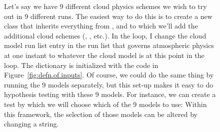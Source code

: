 \begin{latexonly}
\begin{figure}[p]
\caption{Let's say we have 9 different cloud physics schemes we wish
	to try out in 9 different runs.  The easiest way to do this
	is to create a new class  that
	inherits everything from , and to which we'll
	add the additional cloud schemes (, ,
	etc.).
	In the  loop, I change the cloud model
	run list entry in the run list that governs
	atmospheric physics at one instant to whatever the cloud
	model is at this point in the loop.
	The  dictionary is initialized with the code in
	Figure~\ref{fig:defn.of.inputs}.
	Of course, we could do the same thing by running the 9
	models separately, but this set-up makes it easy to do
	hypothesis testing with these 9 models.  For instance, we
	can create a test by which we will choose which of the 9
	models to use:  Within this framework, the selection of
	those models can be altered by changing a string.}
\label{fig:alt.param.inherit.eg}
\end{figure}
\end{latexonly}

